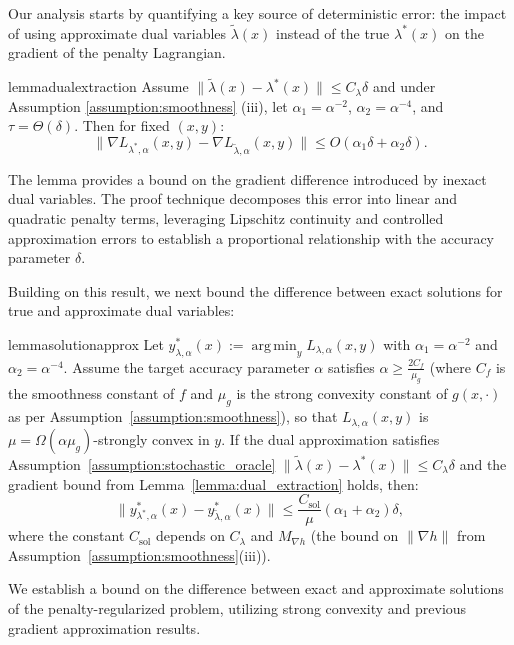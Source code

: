 \documentclass[letterpaper]{article} %
\newcommand{\1}{\mathbf{1}}
\begin{document}
Our analysis starts by quantifying a key source of deterministic error: the impact of using approximate dual variables $\tilde{\lambda}(x)$ instead of the true $\lambda^*(x)$ on the gradient of the penalty Lagrangian.
\begin{restatable}{lemma}{dualextraction}
\label{lemma:dual_extraction}
Assume $\|\tilde{\lambda}(x) - \lambda^*(x)\| \leq C_{\lambda}\delta$ and under Assumption \ref{assumption:smoothness} (iii), let $\alpha_1 = \alpha^{-2}$, $\alpha_2 = \alpha^{-4}$, and $\tau = \Theta(\delta)$. Then for fixed $(x,y)$:
$$ \|\nabla L_{\lambda^*, \alpha}(x, y) - \nabla L_{\tilde{\lambda},\alpha}(x,y)\| \leq O(\alpha_1 \delta + \alpha_2 \delta). $$
\end{restatable}

The lemma provides a bound on the gradient difference introduced by inexact dual variables. The proof technique decomposes this error into linear and quadratic penalty terms, leveraging Lipschitz continuity and controlled approximation errors to establish a proportional relationship with the accuracy parameter $\delta$.



Building on this result, we next bound the difference between exact solutions for true and approximate dual variables:
\begin{restatable}{lemma}{solutionapprox}
\label{lemma:solution_approx}
Let $y^*_{\lambda,\alpha}(x) := \operatorname*{arg\,min}_{y} L_{\lambda,\alpha}(x,y)$ with $\alpha_1=\alpha^{-2}$ and $\alpha_2=\alpha^{-4}$. Assume the target accuracy parameter $\alpha$ satisfies $\alpha \geq \frac{2 C_f}{\mu_g}$ (where $C_f$ is the smoothness constant of $f$ and $\mu_g$ is the strong convexity constant of $g(x,\cdot)$ as per Assumption~\ref{assumption:smoothness}), so that $L_{\lambda,\alpha}(x,y)$ is $\mu = \Omega(\alpha\mu_g)$-strongly convex in $y$. If the dual approximation satisfies Assumption~\ref{assumption:stochastic_oracle} $\|\tilde{\lambda}(x)-\lambda^*(x)\|\le C_\lambda\delta$ and the gradient bound from Lemma~\ref{lemma:dual_extraction} holds, then:
\[
\|y^*_{\lambda^*,\alpha}(x) - y^*_{\tilde{\lambda},\alpha}(x)\| \leq \frac{C_{\text{sol}}}{\mu}(\alpha_1 + \alpha_2)\delta,
\]
where the constant $C_{\text{sol}}$ depends on $C_\lambda$ and $M_{\nabla h}$ (the bound on $\|\nabla h\|$ from Assumption~\ref{assumption:smoothness}(iii)).
\end{restatable}

We establish a bound on the difference between exact and approximate solutions of the penalty-regularized problem, utilizing strong convexity and previous gradient approximation results.
\end{document}

